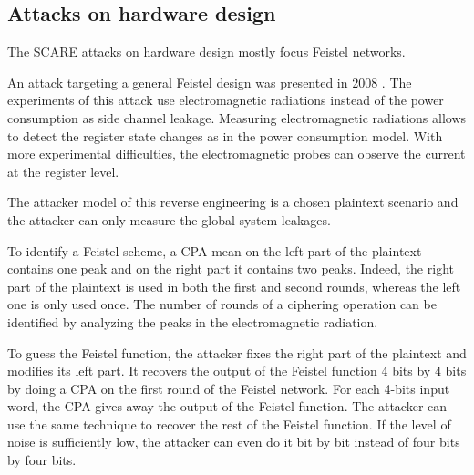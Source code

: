 \documentclass[11pt]{sdm}
\begin{document}


\subsection{Attacks on hardware design}

The SCARE attacks on hardware design mostly focus Feistel networks.

An attack targeting a general Feistel design was presented in 2008 \parencite{Réal_Dubois_Guilloux_Valette_Drissi_2008}.
The experiments of this attack use electromagnetic radiations instead of the power consumption as side channel leakage.
Measuring electromagnetic radiations allows to detect the register state changes as in the power consumption model.
With more experimental difficulties, the electromagnetic probes can observe the current at the register level.

The attacker model of this reverse engineering is a chosen plaintext scenario and the attacker can only measure the global system leakages.

To identify a Feistel scheme, a CPA mean on the left part of the plaintext contains one peak and on the right part it contains two peaks.
Indeed, the right part of the plaintext is used in both the first and second rounds, whereas the left one is only used once.
The number of rounds of a ciphering operation can be identified by analyzing the peaks in the electromagnetic radiation.

To guess the Feistel function, the attacker fixes the right part of the plaintext and modifies its left part.
It recovers the output of the Feistel function 4 bits by 4 bits by doing a CPA on the first round of the Feistel network.
For each 4-bits input word, the CPA gives away the output of the Feistel function.
The attacker can use the same technique to recover the rest of the Feistel function.
If the level of noise is sufficiently low, the attacker can even do it bit by bit instead of four bits by four bits.
\end{document}
